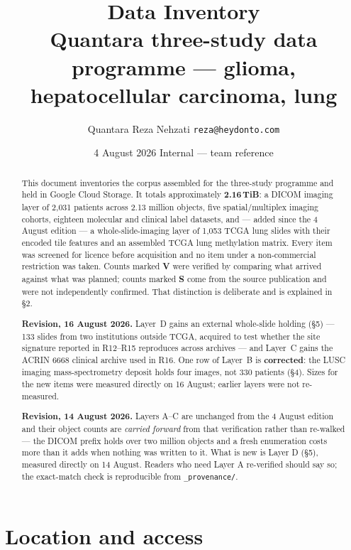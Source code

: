 \documentclass[11pt,a4paper]{article}
\title{\vspace{-1.6em}\color{qnavy}\bfseries Data Inventory\\[4pt]
\large\normalfont\color{qgrey}Quantara three-study data programme --- glioma, hepatocellular
carcinoma, lung}
\author{\normalsize Quantara \;\textperiodcentered\; Reza Nehzati \;\textperiodcentered\;
\texttt{reza@heydonto.com}}
\date{\normalsize 4 August 2026 \;\textperiodcentered\; Internal --- team reference}
\newcommand{\ver}{\textcolor{qgreen}{\textbf{V}}}
\newcommand{\src}{\textcolor{qgrey}{\textbf{S}}}
\begin{document}
\maketitle
\thispagestyle{empty}

\begin{abstract}
\noindent
This document inventories the corpus assembled for the three-study programme and held in
Google Cloud Storage. It totals approximately \textbf{2.16\,TiB}: a DICOM imaging layer of 2{,}031 patients
across 2.13 million objects, five spatial/multiplex imaging cohorts, eighteen molecular and
clinical label datasets, and --- added since the 4 August edition --- a whole-slide-imaging
layer of 1{,}053 TCGA lung slides with their encoded tile features and an assembled
TCGA lung methylation matrix.
Every item was screened for licence before acquisition and no item under a
non-commercial restriction was taken. Counts marked \ver{} were verified by comparing what
arrived against what was planned; counts marked \src{} come from the source publication
and were not independently confirmed. That distinction is deliberate and is explained in
\S2.

\medskip
\noindent\textbf{Revision, 16 August 2026.} Layer~D gains an external whole-slide
holding (\S5) --- 133 slides from two institutions outside TCGA, acquired to test whether the
site signature reported in R12--R15 reproduces across archives --- and Layer~C gains the
ACRIN 6668 clinical archive used in R16. One row of Layer~B is \textbf{corrected}: the LUSC
imaging mass-spectrometry deposit holds four images, not 330 patients (\S4). Sizes for the new
items were measured directly on 16 August; earlier layers were not re-measured.

\medskip
\noindent\textbf{Revision, 14 August 2026.} Layers A--C are unchanged from the 4 August
edition and their object counts are \emph{carried forward} from that verification rather than
re-walked --- the DICOM prefix holds over two million objects and a fresh enumeration costs
more than it adds when nothing was written to it. What is new is Layer D (\S5), measured
directly on 14 August. Readers who need Layer A re-verified should say so; the exact-match
check is reproducible from \texttt{\_provenance/}.
\end{abstract}

\section{Location and access}
\end{document}
